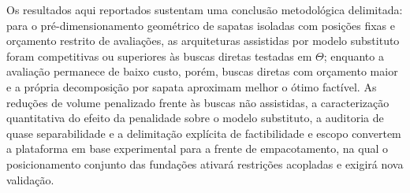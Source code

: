 Os resultados aqui reportados sustentam uma conclusão metodológica delimitada: para o pré-dimensionamento geométrico de sapatas isoladas com posições fixas e orçamento restrito de avaliações, as arquiteturas assistidas por modelo substituto foram competitivas ou superiores às buscas diretas testadas em $\Theta$; enquanto a avaliação permanece de baixo custo, porém, buscas diretas com orçamento maior e a própria decomposição por sapata aproximam melhor o ótimo factível. As reduções de volume penalizado frente às buscas não assistidas, a caracterização quantitativa do efeito da penalidade sobre o modelo substituto, a auditoria de quase separabilidade e a delimitação explícita de factibilidade e escopo convertem a plataforma \fundaai{} em base experimental para a frente de empacotamento, na qual o posicionamento conjunto das fundações ativará restrições acopladas e exigirá nova validação.
